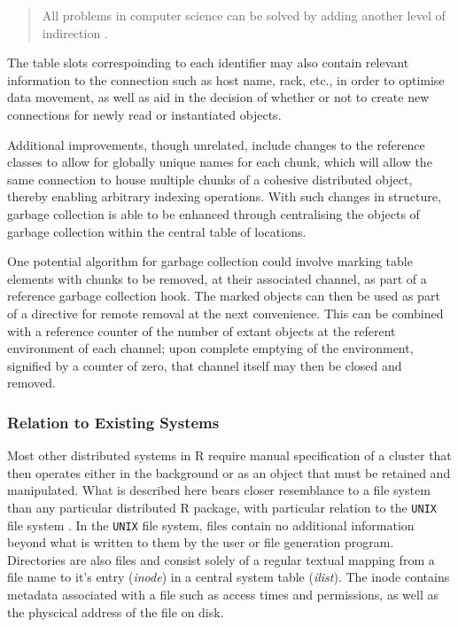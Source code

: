 \begin{quote}
All problems in computer science can be solved by adding another level
of indirection \cite{oram2007beautiful}.
\end{quote}

The table slots correspoinding to each identifier may also contain
relevant information to the connection such as host name, rack, etc., in
order to optimise data movement, as well as aid in the decision of
whether or not to create new connections for newly read or instantiated
objects.

Additional improvements, though unrelated, include changes to the
reference classes to allow for globally unique names for each chunk,
which will allow the same connection to house multiple chunks of a
cohesive distributed object, thereby enabling arbitrary indexing
operations. With such changes in structure, garbage collection is able
to be enhanced through centralising the objects of garbage collection
within the central table of locations.

One potential algorithm for garbage collection could involve marking
table elements with chunks to be removed, at their associated channel,
as part of a reference garbage collection hook. The marked objects can
then be used as part of a directive for remote removal at the next
convenience. This can be combined with a reference counter of the number
of extant objects at the referent environment of each channel; upon
complete emptying of the environment, signified by a counter of zero,
that channel itself may then be closed and removed.

\hypertarget{sec:localrel}{%
\subsubsection{Relation to Existing Systems}\label{sec:localrel}}

Most other distributed systems in R require manual specification of a
cluster that then operates either in the background or as an object that
must be retained and manipulated. What is described here bears closer
resemblance to a file system than any particular distributed R package,
with particular relation to the \texttt{UNIX} file system
\cite{ritchie1979evolution}\cite{thompson1974unix}. In the \texttt{UNIX}
file system, files contain no additional information beyond what is
written to them by the user or file generation program. Directories are
also files and consist solely of a regular textual mapping from a file
name to it's entry (\emph{inode}) in a central system table
(\emph{ilist}). The inode contains metadata associated with a file such
as access times and permissions, as well as the physcical address of the
file on disk.

